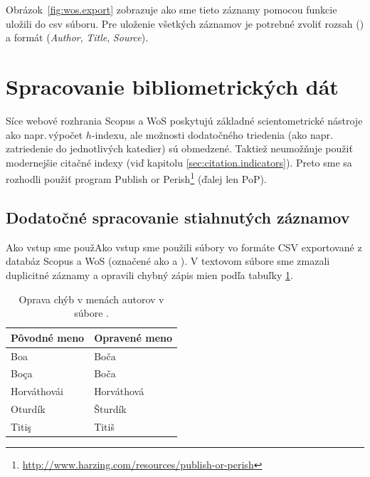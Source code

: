 Obrázok~\ref{fig:wos.export} zobrazuje ako sme tieto záznamy pomocou funkcie
 uložili do csv súboru.  Pre uloženie všetkých
záznamov je potrebné zvoliť rozsah () a formát (\emph{Author},
\emph{Title}, \emph{Source}).


\section{Spracovanie bibliometrických dát}

Síce webové rozhrania Scopus a WoS poskytujú základné scientometrické nástroje
ako napr.\,výpočet $h$-indexu, ale možnosti dodatočného triedenia (ako
napr.\,zatriedenie do jednotlivých katedier) sú obmedzené.  Taktiež neumožňuje
použiť modernejšie citačné indexy (viď kapitolu \ref{sec:citation.indicators}).
Preto sme sa rozhodli použiť program Publish or
Perish\footnote{\url{http://www.harzing.com/resources/publish-or-perish}} (ďalej
len PoP).


\subsection{Dodatočné spracovanie stiahnutých záznamov}

Ako vstup sme použAko vstup sme použili súbory vo formáte CSV exportované z
databáz Scopus a WoS (označené ako  a
).  V textovom súbore
 sme zmazali duplicitné záznamy a opravili
chybný zápis mien podľa tabuľky \ref{tab:wos.namecorrections}.

\begin{table}
\centering\small
\begin{tabular}{ll}
  \hline\noalign{\vspace{.3ex}}
  Pôvodné meno & Opravené meno \\[0.3ex]
  \hline\noalign{\vspace{.5ex}}
  Boa          & Boča       \\
  Boça         & Boča       \\
  Horváthovái  & Horváthová \\
  Oturdík      & Šturdík    \\
  Titiş        & Titiš      \\[0.5ex]
  \hline
\end{tabular}
\caption{Oprava chýb v menách autorov v súbore .}
\label{tab:wos.namecorrections}
\end{table}

